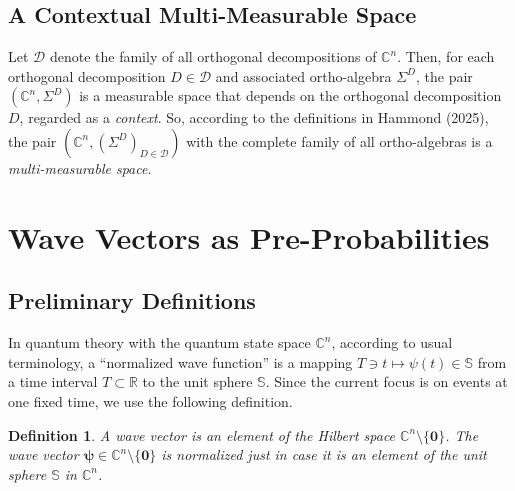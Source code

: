 \documentclass[11pt]{article}
\newcommand \R { \mathbb{R} }
\newcommand \C { \mathbb{C} }
\newcommand \Sph { \mathbb{S} }
\newtheorem{definition}[theorem]{Definition}
\begin{document}
\subsection{A Contextual Multi-Measurable Space} \label{ss:contextualMultMeas}

Let $ \mathcal D$ denote the family of all orthogonal decompositions of $ \C^n $.
Then, for each orthogonal decomposition $D \in \mathcal D$
and associated ortho-algebra $ \Sigma ^D $,
the pair $( \C^n, \Sigma ^D )$ is a measurable space
that depends on the orthogonal decomposition $D$,
regarded as a \emph{context}.
So, according to the definitions in Hammond (2025), 
the pair $( \C^n, ( \Sigma ^D )_{D \in \mathcal D}) $
with the complete family of all ortho-algebras is a \emph{multi-measurable space}.

\section{Wave Vectors as Pre-Probabilities} \label{s:waveVectors}
\subsection{Preliminary Definitions}

In quantum theory with the quantum state space $ \C^n $,
according to usual terminology, a ``normalized wave function'' is a mapping 
 \( T \owns t \mapsto \psi (t) \in \Sph \) from a time interval $T \subset \R$ 
to the unit sphere $ \Sph $. 
Since the current focus is on events at one fixed time, we use the following definition.

\begin{definition}
	A \emph{wave vector} is an element of the Hilbert space $ \C^n \setminus \{ \mathbf 0\}$. 
	The wave vector $ \boldsymbol \psi \in \C^n \setminus \{ \mathbf 0\} $ is \emph{normalized}
	just in case it is an element of the unit sphere $ \Sph $ in $ \C^n $.
\end{definition}
\end{document}
